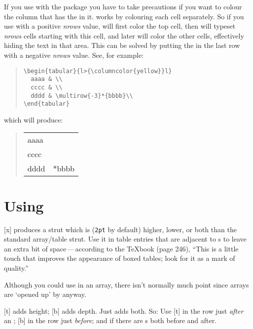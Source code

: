 \documentclass[a4paper]{article}
\begin{document}
If you use  with the  package you have
to take precautions if you want to colour the column that has the
 in it.   works by colouring each cell
separately.  So if you use  with a positive \emph{nrows}
value,  will first color the top cell, then
 will typeset \emph{nrows} cells starting with this cell,
and later  will color the other cells, effectively
hiding the text in that area.  This can be solved by putting the
 in the last row with a negative \emph{nrows} value.
See, for example:
\begin{quote}
\begin{verbatim}
\begin{tabular}{l>{\columncolor{yellow}}l}
  aaaa & \\
  cccc & \\
  dddd & \multirow{-3}*{bbbb}\\
\end{tabular}
\end{verbatim}
\end{quote}
which will produce:
\begin{quote}
  \begin{tabular}{l>{\columncolor{yellow}}l}
    aaaa & \\
    cccc & \\
    dddd & \multirow{-3}*{bbbb}\\
  \end{tabular}
\end{quote}

\section{Using }

[x] produces a strut which is 
(\texttt{2pt} by default) higher, lower, or both than the standard
array/table strut.  Use it in table entries that are adjacent to
s to leave an extra bit of space\,---\,according to the
TeXbook (page 246), ``This is a little touch that improves the
appearance of boxed tables; look for it as a mark of quality.''

Although you could use  in an array, there isn't normally
much point since arrays are `opened up' by  anyway.

[t] adds height; [b] adds
depth.  Just  adds both.  So:  Use
[t] in the row just \emph{after} an ;
[b] in the row just \emph{before}; and
 if there are s both before and after.
\end{document}
